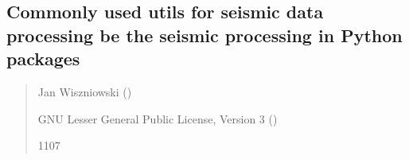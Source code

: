 \documentclass[letterpaper,10pt,english]{sphinxmanual}
\begin{document}
\subsection{Commonly used utils for seismic data processing be the seismic processing in Python packages}
\label{\detokenize{api_core:commonly-used-utils-for-seismic-data-processing-be-the-seismic-processing-in-python-packages}}\label{\detokenize{api_core:module-core.utils}}\begin{quote}\begin{description}
\sphinxAtStartPar
Jan Wiszniowski ()

\sphinxAtStartPar
GNU Lesser General Public License, Version 3
()

\sphinxhyphen{}11\sphinxhyphen{}07

\end{description}\end{quote}
\end{document}
